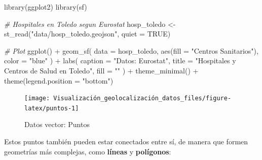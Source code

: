 \documentclass[
]{book}
\newenvironment{Shaded}{\begin{snugshade}}{\end{snugshade}}
\newcommand{\AttributeTok}[1]{\textcolor[rgb]{0.77,0.63,0.00}{#1}}
\newcommand{\CommentTok}[1]{\textcolor[rgb]{0.56,0.35,0.01}{\textit{#1}}}
\newcommand{\ConstantTok}[1]{\textcolor[rgb]{0.00,0.00,0.00}{#1}}
\newcommand{\FunctionTok}[1]{\textcolor[rgb]{0.00,0.00,0.00}{#1}}
\newcommand{\NormalTok}[1]{#1}
\newcommand{\OtherTok}[1]{\textcolor[rgb]{0.56,0.35,0.01}{#1}}
\newcommand{\SpecialCharTok}[1]{\textcolor[rgb]{0.00,0.00,0.00}{#1}}
\newcommand{\StringTok}[1]{\textcolor[rgb]{0.31,0.60,0.02}{#1}}
\theoremstyle{definition}
\theoremstyle{definition}
\theoremstyle{definition}
\theoremstyle{definition}
\theoremstyle{remark}
\begin{document}
\begin{Shaded}
\begin{Highlighting}[]

\FunctionTok{library}\NormalTok{(ggplot2)}
\FunctionTok{library}\NormalTok{(sf)}


\CommentTok{\# Hospitales en Toledo segun Eurostat}
\NormalTok{hosp\_toledo }\OtherTok{\textless{}{-}} \FunctionTok{st\_read}\NormalTok{(}\StringTok{"data/hosp\_toledo.geojson"}\NormalTok{, }\AttributeTok{quiet =} \ConstantTok{TRUE}\NormalTok{)}

\CommentTok{\# Plot}
\FunctionTok{ggplot}\NormalTok{() }\SpecialCharTok{+}
  \FunctionTok{geom\_sf}\NormalTok{(}
    \AttributeTok{data =}\NormalTok{ hosp\_toledo, }\FunctionTok{aes}\NormalTok{(}\AttributeTok{fill =} \StringTok{"Centros Sanitarios"}\NormalTok{),}
    \AttributeTok{color =} \StringTok{"blue"}
\NormalTok{  ) }\SpecialCharTok{+}
  \FunctionTok{labs}\NormalTok{(}
    \AttributeTok{caption =} \StringTok{"Datos: Eurostat"}\NormalTok{,}
    \AttributeTok{title =} \StringTok{"Hospitales y Centros de Salud en Toledo"}\NormalTok{,}
    \AttributeTok{fill =} \StringTok{""}
\NormalTok{  ) }\SpecialCharTok{+}
  \FunctionTok{theme\_minimal}\NormalTok{() }\SpecialCharTok{+}
  \FunctionTok{theme}\NormalTok{(}\AttributeTok{legend.position =} \StringTok{"bottom"}\NormalTok{)}
\end{Highlighting}
\end{Shaded}

\begin{figure}

{\centering \texttt{[image: Visualización\_geolocalización\_datos\_files/figure-latex/puntos-1]} 

}

\caption{Datos vector: Puntos}\label{fig:puntos}
\end{figure}

Estos puntos también pueden estar conectados entre sí, de manera que formen
geometrías más complejas, como \textbf{líneas} y \textbf{polígonos}:
\end{document}

